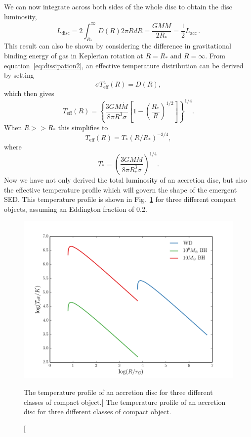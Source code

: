 We can now integrate across both sides of the whole disc to obtain the disc luminosity,
\begin{equation}
L_{\mathrm{disc}} = 2 \int^\infty_{R_*} D(R) 2\pi R dR = \frac{G M \dot{M}}{2 R_*} = \frac{1}{2} L_{\mathrm{acc}}\, .
\label{eq:ldisc}
\end{equation}
This result can also be shown by considering the difference in gravitational
binding energy of gas in Keplerian rotation at $R=R_*$ and $R=\infty$.
From equation~\ref{eq:dissipation2}, an 
effective temperature distribution can be derived by setting
\begin{equation}
\sigma T_{\mathrm{eff}}^4 (R) = D(R),
\end{equation}
which then gives
\begin{equation}
T_{\mathrm{eff}} (R) = \left \{ \frac{3 G M \dot{M}}{8 \pi R^3 \sigma} \left[1 - \left( \frac{R_*}{R} \right)^{1/2} \right]\right \} ^{1/4}.
\label{disk_t_profile}
\end{equation}
When $R>>R_*$ this simplifies to
\begin{equation}
T_{\mathrm{eff}} (R) = T_* (R / R_*)^{-3/4},
\end{equation}
where
\begin{equation}
T_* = \left ( \frac{3 G M \dot{M}}{8 \pi R_*^3 \sigma} \right)^{1/4}.
\end{equation}
Now we have not only derived the total luminosity of an accretion disc, but
also the effective temperature profile which will govern the shape of the emergent SED.
This temperature profile is shown in Fig.~\ref{fig:disk_t}
for three different compact objects, assuming an Eddington fraction of 0.2.

\begin{figure}
\centering
\includegraphics[width=1.0\textwidth]{figures/01-intro/disk_t.png}
\caption
[The temperature profile of an accretion disc for three different classes
of compact object.]
{
The temperature profile of an accretion disc for three different classes
of compact object.
} 
\label{fig:disk_t}
\end{figure}

